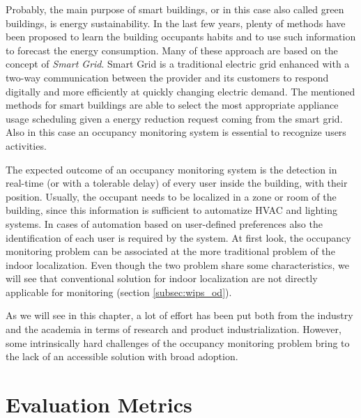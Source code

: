 \smallskip
Probably, the main purpose of smart buildings, or in this case also called green buildings, is energy sustainability.
In the last few years, plenty of methods have been proposed to learn the building occupants habits and to use such information to forecast the energy consumption.
Many of these approach are based on the concept of \emph{Smart Grid}. Smart Grid is a traditional electric grid enhanced with a two-way communication between the provider and its customers to respond digitally and more efficiently at quickly changing electric demand.
The mentioned methods for smart buildings are able to select the most appropriate appliance usage scheduling given a energy reduction request coming from the smart grid. Also in this case an occupancy monitoring system is essential to recognize users activities.

\medskip
The expected outcome of an occupancy monitoring system is the detection in real-time (or with a tolerable delay) of every user inside the building, with their position. Usually, the occupant needs to be localized in a zone or room of the building, since this information is sufficient to automatize HVAC and lighting systems. In cases of automation based on user-defined preferences also the identification of each user is required by the system.
At first look, the occupancy monitoring problem can be associated at the more traditional problem of the indoor localization. Even though the two problem share some characteristics, we will see that conventional solution for indoor localization are not directly applicable for monitoring (section \ref{subsec:wips_od}).

\smallskip
As we will see in this chapter, a lot of effort has been put both from the industry and the academia in terms of research and product industrialization. However, some intrinsically hard challenges of the occupancy monitoring problem bring to the lack of an accessible solution with broad adoption.


\section{Evaluation Metrics}

